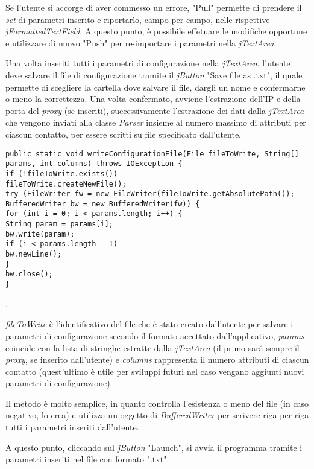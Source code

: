 Se l'utente si accorge di aver commesso un errore, "Pull" permette di prendere il \textit{set} di parametri inserito e riportarlo, campo per campo, nelle rispettive \textit{jFormattedTextField}. A questo punto, \`{e} possibile effetuare le modifiche opportune e utilizzare di nuovo "Push" per re-importare i parametri nella \textit{jTextArea}. 

Una volta inseriti tutti i parametri di configurazione nella \textit{jTextArea}, l'utente deve salvare il file di configurazione tramite il \textit{jButton} "Save file as .txt", il quale permette di scegliere la cartella dove salvare il file, dargli un nome e confermarne o meno la correttezza. Una volta confermato, avviene l'estrazione dell'IP e della porta del \textit{proxy} (se inseriti), successivamente l'estrazione dei dati dalla \textit{jTextArea} che vengono inviati alla classe \textit{Parser} insieme al numero massimo di attributi per ciascun contatto, per essere scritti su file specificato dall'utente.

\vspace{0.5cm}
\begin{lstlisting}
public static void writeConfigurationFile(File fileToWrite, String[] params, int columns) throws IOException {
if (!fileToWrite.exists())
fileToWrite.createNewFile();
try (FileWriter fw = new FileWriter(fileToWrite.getAbsolutePath()); 
BufferedWriter bw = new BufferedWriter(fw)) {
for (int i = 0; i < params.length; i++) {
String param = params[i];
bw.write(param);
if (i < params.length - 1)
bw.newLine();
} 
bw.close();     
}
\end{lstlisting}.

\textit{fileToWrite} \`{e} l'identificativo del file che \`{e} stato creato dall'utente per salvare i parametri di configurazione secondo il formato accettato dall'applicativo, \textit{params} coincide con la lista di stringhe estratte dalla \textit{jTextArea} (il primo sar\'a sempre il \textit{proxy}, se inserito dall'utente) e \textit{columns} rappresenta il numero attributi di ciascun contatto (quest'ultimo \`{e} utile per sviluppi futuri nel caso vengano aggiunti nuovi parametri di configurazione).

Il metodo \`{e} molto semplice, in quanto controlla l'esistenza o meno del file (in caso negativo, lo crea) e utilizza un oggetto di \textit{BufferedWriter} per scrivere riga per riga tutti i parametri inseriti dall'utente.

A questo punto, cliccando sul \textit{jButton} "Launch", si avvia il programma tramite i parametri inseriti nel file con formato ".txt".

